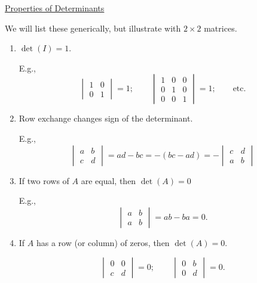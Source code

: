 \documentclass[reqno]{amsart}
\theoremstyle{definition}
\begin{document}
\underline{Properties of Determinants}

We will list these generically, but illustrate with $2 \times 2$ matrices.

\begin{enumerate}

\item  $\det(I) = 1$.

E.g.,
%
\begin{equation*}
\begin{vmatrix}
1 & 0\\
0 &1
\end{vmatrix} = 1; \qquad \begin{vmatrix}
1 & 0 & 0\\
0 & 1 & 0\\
0 & 0 & 1
\end{vmatrix} = 1; \qquad \text{etc.}
\end{equation*}

\item  Row exchange changes sign of the determinant.

E.g.,
\begin{equation*}
\begin{vmatrix}
a & b\\
c & d
\end{vmatrix} = ad - bc = -(bc - ad) = -\begin{vmatrix}
c & d\\
a & b
\end{vmatrix}
\end{equation*}

\item  If two rows of $A$ are equal, then $\det(A) = 0$

E.g.,
%
\begin{equation*}
\begin{vmatrix}
a & b\\
a & b
\end{vmatrix} = ab - ba = 0.
\end{equation*}

\item  If $A$ has a row (or column) of zeros, then $\det(A) = 0$.

\begin{equation*}
\begin{vmatrix}
0 & 0\\
c & d
\end{vmatrix} = 0;\qquad \begin{vmatrix}
0 & b\\
0 & d
\end{vmatrix} = 0.
\end{equation*}


\end{enumerate}
\end{document}
